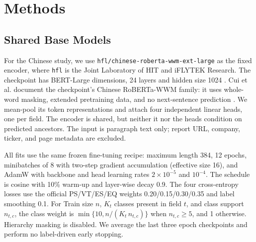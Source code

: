 \section{Methods}

\subsection{Shared Base Models}
For the Chinese study, we use
{\small\texttt{hfl/chinese-roberta-wwm-ext-large}} as the fixed encoder, where
\texttt{hfl} is the Joint Laboratory of HIT and iFLYTEK Research. The
checkpoint has BERT-Large dimensions, 24 layers and hidden size 1024
\cite{devlin2019bert}. Cui et al. document the checkpoint's
Chinese RoBERTa-WWM family: it uses whole-word masking, extended pretraining
data, and no next-sentence prediction \cite{cui2021wwm}. We
mean-pool its token representations and attach four independent linear heads,
one per field. The encoder is shared, but neither it nor the heads condition on
predicted ancestors. The input is paragraph text only; report URL, company,
ticker, and page metadata are excluded.

All fits use the same frozen fine-tuning recipe: maximum length 384, 12 epochs,
minibatches of 8 with two-step gradient accumulation (effective size 16), and
AdamW with backbone and head learning rates $2\times10^{-5}$ and $10^{-4}$.
The schedule is cosine with 10\% warm-up and layer-wise decay 0.9. The four
cross-entropy losses use the official PS/VT/ES/EQ weights
0.20/0.15/0.30/0.35 and label smoothing 0.1. For Train size $n$, $K_t$ classes
present in field $t$, and class support $n_{t,c}$, the class weight is
$\min\{10,n/(K_t\,n_{t,c})\}$ when $n_{t,c}\geq5$, and 1 otherwise. Hierarchy
masking is disabled. We average the last three epoch checkpoints and perform
no label-driven early stopping.

